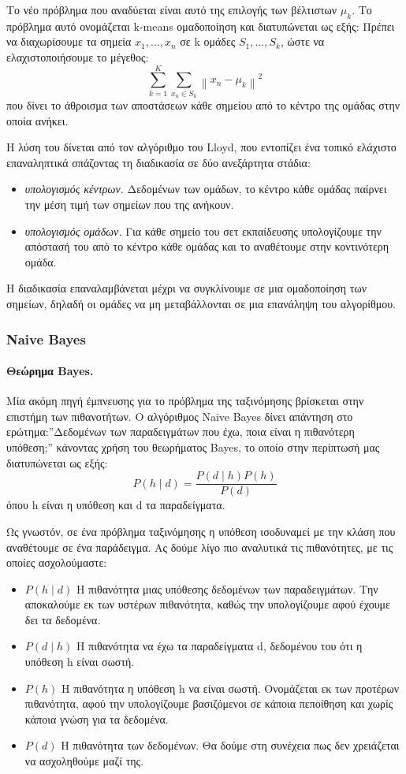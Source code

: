 \documentclass{article}
\newcommand{\norm}[1]{\left\lVert#1\right\rVert}
\begin{document}
Το νέο πρόβλημα που αναδύεται είναι αυτό της επιλογής των βέλτιστων $\mu_k$. Το πρόβλημα αυτό ονομάζεται k-means ομαδοποίηση και διατυπώνεται ως εξής: Πρέπει να διαχωρίσουμε τα σημεία $x_1,..., x_n$ σε k ομάδες $S_1,...,S_k$, ώστε να ελαχιστοποιήσουμε το μέγεθος:
$$\sum_{k=1}^{K} \sum_{x_n \in S_k} \norm{x_n - \mu_k}^2$$
που δίνει το άθροισμα των αποστάσεων κάθε σημείου από το κέντρο της ομάδας στην οποία ανήκει.

Η λύση του δίνεται από τον αλγόριθμο του Lloyd, που εντοπίζει ένα τοπικό ελάχιστο επαναληπτικά σπάζοντας τη διαδικασία σε δύο ανεξάρτητα στάδια:
\begin{itemize}
\item \textit{υπολογισμός κέντρων.} Δεδομένων των ομάδων, το κέντρο κάθε ομάδας παίρνει την μέση τιμή των σημείων που της ανήκουν.
\item \textit{υπολογισμός ομάδων.} Για κάθε σημείο του σετ εκπαίδευσης υπολογίζουμε την απόστασή του από το κέντρο κάθε ομάδας και το αναθέτουμε στην κοντινότερη ομάδα.
\end{itemize}

Η διαδικασία επαναλαμβάνεται μέχρι να συγκλίνουμε σε μια ομαδοποίηση των σημείων, δηλαδή οι ομάδες να μη μεταβάλλονται σε μια επανάληψη του αλγορίθμου.
\subsubsection{Naive Bayes}
\paragraph{Θεώρημα Bayes.} Μία ακόμη πηγή έμπνευσης για το πρόβλημα της ταξινόμησης βρίσκεται στην επιστήμη των πιθανοτήτων. Ο αλγόριθμος Naive Bayes δίνει απάντηση στο ερώτημα:”Δεδομένων των
παραδειγμάτων που έχω, ποια είναι η πιθανότερη υπόθεση;” κάνοντας χρήση του θεωρήματος Bayes, το οποίο στην περίπτωσή μας διατυπώνεται ως εξής: 
$$P(h \mid d)= \frac{P(d \mid h) P(h)}{P(d)}$$
όπου h είναι η υπόθεση και d τα παραδείγματα.

Ως γνωστόν, σε ένα πρόβλημα ταξινόμησης η υπόθεση ισοδυναμεί με την κλάση που αναθέτουμε σε ένα παράδειγμα. Ας δούμε λίγο πιο αναλυτικά τις πιθανότητες, με τις οποίες ασχολούμαστε:
\begin{itemize}
\item $P(h \mid d)$ Η πιθανότητα μιας υπόθεσης δεδομένων των παραδειγμάτων. Την αποκαλούμε εκ των υστέρων πιθανότητα, καθώς την υπολογίζουμε αφού έχουμε δει τα δεδομένα.
\item $P(d \mid h)$ Η πιθανότητα να έχω τα παραδείγματα d, δεδομένου του ότι η υπόθεση h είναι σωστή.
\item $P( h)$ Η πιθανότητα η υπόθεση h να είναι σωστή. Ονομάζεται εκ των προτέρων πιθανότητα, αφού την υπολογίζουμε βασιζόμενοι σε κάποια πεποίθηση και χωρίς κάποια γνώση για τα δεδομένα.
\item $P(d)$ Η πιθανότητα των δεδομένων. Θα δούμε στη συνέχεια πως δεν χρειάζεται να ασχοληθούμε μαζί της.
\end{itemize}
\end{document}

